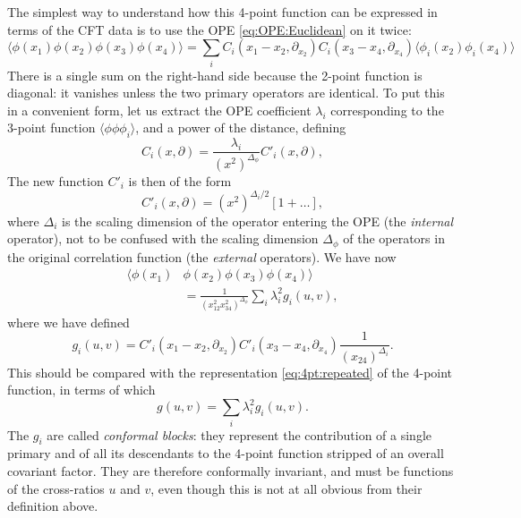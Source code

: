 \documentclass[a4paper,12pt]{article}
\numberwithin{equation}{section}
\begin{document}
The simplest way to understand how this 4-point function can be expressed in terms of the CFT data is to use the OPE \eqref{eq:OPE:Euclidean} on it twice:
\begin{equation}
	\langle \phi(x_1) \phi(x_2) \phi(x_3) \phi(x_4) \rangle
	= \sum_i C_i\left( x_1 - x_2, \partial_{x_2} \right)
	C_i\left( x_3 - x_4, \partial_{x_4} \right)
	\langle \phi_i(x_2) \phi_i(x_4) \rangle
\end{equation}
There is a single sum on the right-hand side because the 2-point function is diagonal: it vanishes unless the two primary operators are identical. To put this in a convenient form, let us extract the OPE coefficient $\lambda_i$ corresponding to the 3-point function $\langle \phi\phi\phi_i\rangle$, and a power of the distance, defining
\begin{equation}
	C_i(x, \partial)
	= \frac{\lambda_i}{(x^2)^{\Delta_\phi}}
	C'_i(x, \partial),
\end{equation}
The new function $C'_i$ is then of the form
\begin{equation}
	C'_i(x, \partial) = (x^2)^{\Delta_i/2}
	\left[ 1 + \ldots \right],
\end{equation}
where $\Delta_i$ is the scaling dimension of the operator entering the OPE (the \emph{internal} operator), not to be confused with the scaling dimension $\Delta_\phi$ of the operators in the original correlation function (the \emph{external} operators).
We have now
\begin{equation}
\begin{aligned}
	\langle \phi(x_1) & \phi(x_2) \phi(x_3) \phi(x_4) \rangle
	\\
	&= \frac{1}{(x_{12}^2 x_{34}^2)^{\Delta_\phi}}
	\sum_i \lambda_i^2 g_i(u,v),
\end{aligned}
\end{equation}
where we have defined
\begin{equation}
	g_i(u,v) =
	C'_i\left( x_1 - x_2, \partial_{x_2} \right)
	C'_i\left( x_3 - x_4, \partial_{x_4} \right)
	\frac{1}{(x_{24})^{\Delta_i}}.
\end{equation}
This should be compared with the representation \eqref{eq:4pt:repeated} of the 4-point function, in terms of which
\begin{equation}
	g(u,v) = \sum_i \lambda_i^2 g_i(u,v).
\end{equation}
The $g_i$ are called \emph{conformal blocks}: they represent the contribution of a single primary and of all its descendants to the 4-point function stripped of an overall covariant factor. They are therefore conformally invariant, and must be functions of the cross-ratios $u$ and $v$, even though this is not at all obvious from their definition above. 
\end{document}
